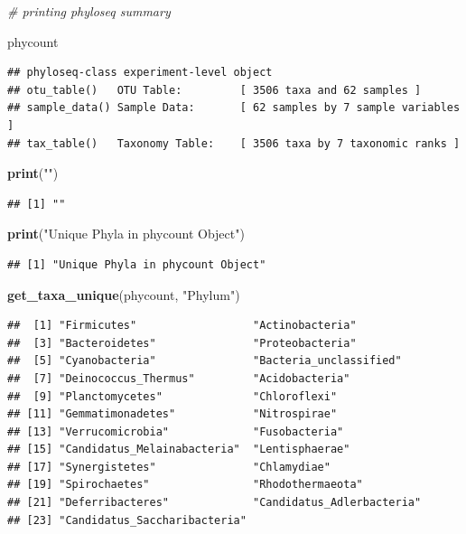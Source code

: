 \documentclass[
]{article}
\newenvironment{Shaded}{\begin{snugshade}}{\end{snugshade}}
\newcommand{\CommentTok}[1]{\textcolor[rgb]{0.56,0.35,0.01}{\textit{#1}}}
\newcommand{\FunctionTok}[1]{\textcolor[rgb]{0.13,0.29,0.53}{\textbf{#1}}}
\newcommand{\NormalTok}[1]{#1}
\newcommand{\StringTok}[1]{\textcolor[rgb]{0.31,0.60,0.02}{#1}}
\begin{document}
\begin{Shaded}
\begin{Highlighting}[]
\CommentTok{\# printing phyloseq summary}

\NormalTok{phycount}
\end{Highlighting}
\end{Shaded}

\begin{verbatim}
## phyloseq-class experiment-level object
## otu_table()   OTU Table:         [ 3506 taxa and 62 samples ]
## sample_data() Sample Data:       [ 62 samples by 7 sample variables ]
## tax_table()   Taxonomy Table:    [ 3506 taxa by 7 taxonomic ranks ]
\end{verbatim}

\begin{Shaded}
\begin{Highlighting}[]
\FunctionTok{print}\NormalTok{(}\StringTok{""}\NormalTok{)}
\end{Highlighting}
\end{Shaded}

\begin{verbatim}
## [1] ""
\end{verbatim}

\begin{Shaded}
\begin{Highlighting}[]
\FunctionTok{print}\NormalTok{(}\StringTok{"Unique Phyla in phycount Object"}\NormalTok{)}
\end{Highlighting}
\end{Shaded}

\begin{verbatim}
## [1] "Unique Phyla in phycount Object"
\end{verbatim}

\begin{Shaded}
\begin{Highlighting}[]
\FunctionTok{get\_taxa\_unique}\NormalTok{(phycount, }\StringTok{"Phylum"}\NormalTok{)}
\end{Highlighting}
\end{Shaded}

\begin{verbatim}
##  [1] "Firmicutes"                  "Actinobacteria"             
##  [3] "Bacteroidetes"               "Proteobacteria"             
##  [5] "Cyanobacteria"               "Bacteria_unclassified"      
##  [7] "Deinococcus_Thermus"         "Acidobacteria"              
##  [9] "Planctomycetes"              "Chloroflexi"                
## [11] "Gemmatimonadetes"            "Nitrospirae"                
## [13] "Verrucomicrobia"             "Fusobacteria"               
## [15] "Candidatus_Melainabacteria"  "Lentisphaerae"              
## [17] "Synergistetes"               "Chlamydiae"                 
## [19] "Spirochaetes"                "Rhodothermaeota"            
## [21] "Deferribacteres"             "Candidatus_Adlerbacteria"   
## [23] "Candidatus_Saccharibacteria"
\end{verbatim}
\end{document}
